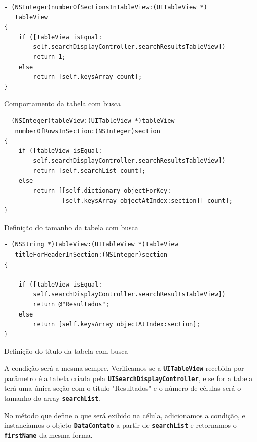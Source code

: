 \documentclass[a4paper,12pt,brazil,oneside]{book}
\begin{document}
\begin{listing}[H]
\begin{verbatim}
- (NSInteger)numberOfSectionsInTableView:(UITableView *)
   tableView
{
    if ([tableView isEqual:
        self.searchDisplayController.searchResultsTableView])
        return 1;
    else
        return [self.keysArray count];
}
\end{verbatim}
\caption{Comportamento da tabela com busca}
\end{listing}

\begin{listing}[H]
\begin{verbatim}
- (NSInteger)tableView:(UITableView *)tableView
   numberOfRowsInSection:(NSInteger)section
{
    if ([tableView isEqual:
        self.searchDisplayController.searchResultsTableView])
        return [self.searchList count];
    else
        return [[self.dictionary objectForKey:
                [self.keysArray objectAtIndex:section]] count];
}
\end{verbatim}
\caption{Definição do tamanho da tabela com busca}
\end{listing}

\begin{listing}[H]
\begin{verbatim}
- (NSString *)tableView:(UITableView *)tableView
   titleForHeaderInSection:(NSInteger)section
{
    
    if ([tableView isEqual:
        self.searchDisplayController.searchResultsTableView])
        return @"Resultados";
    else
        return [self.keysArray objectAtIndex:section];
}
\end{verbatim}
\caption{Definição do título da tabela com busca}
\end{listing}


A condição será a mesma sempre. Verificamos se a \texttt{\textbf{UITableView}} recebida por parâmetro é a tabela criada pela \texttt{\textbf{UISearchDisplayController}}, e se for a tabela terá uma única seção com o título "Resultados" e o número de células será o tamanho do array \texttt{\textbf{searchList}}.

No método que define o que será exibido na célula, adicionamos a condição, e instanciamos o objeto \texttt{\textbf{DataContato}} a partir de \texttt{\textbf{searchList}} e retornamos o \texttt{\textbf{firstName}} da mesma forma.
\end{document}
